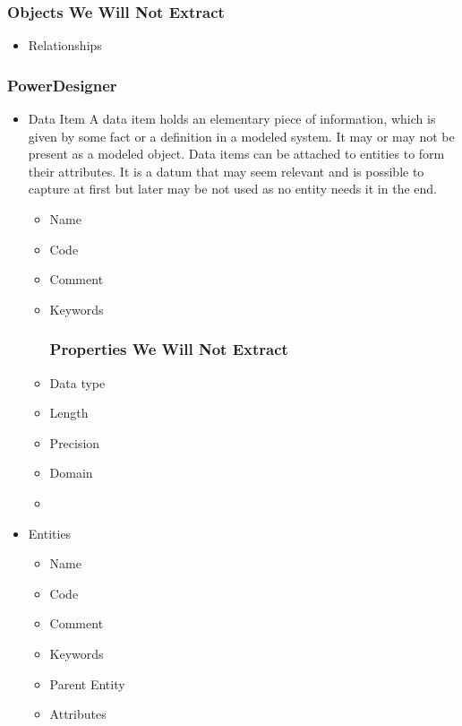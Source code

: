 \begin{itemize}
	\subsubsection{Objects We Will Not Extract}
	\begin{itemize}
		\item Relationships
	\end{itemize}
\end{itemize}


\subsubsection{PowerDesigner}

\begin{itemize}
	\item Data Item
	A data item holds an elementary piece of information, which is given by some fact or a definition in a modeled system. It may or may not be present as a modeled object. Data items can be attached to entities to form their attributes. It is a datum that may seem relevant and is possible to capture at first but later may be not used as no entity needs it in the end.
	\begin{itemize}
		\item Name 
		\item Code 
		\item Comment
		\item Keywords
		\subsubsection{Properties We Will Not Extract}
		\item Data type
		\item Length
		\item Precision
		\item Domain
		\item {}
	\end{itemize}
	\item Entities
	\begin{itemize}
		\item Name 
		\item Code 
		\item Comment
		\item Keywords
		\item Parent Entity
		\item Attributes

\end{itemize}
\end{itemize}

